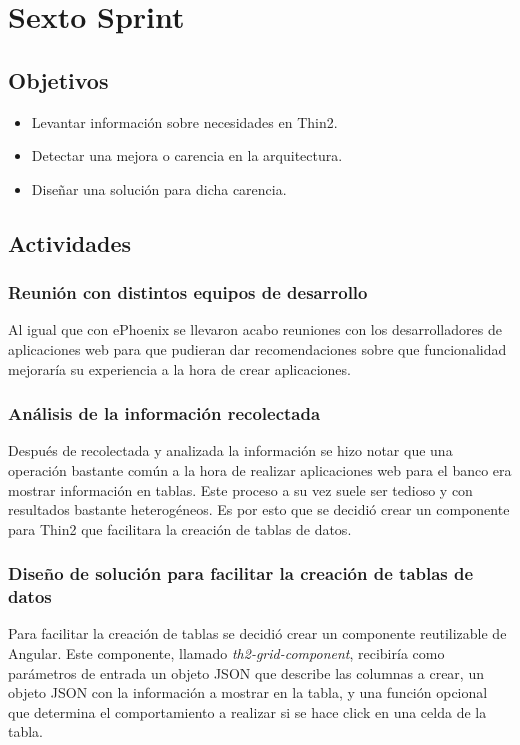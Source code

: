\section{Sexto Sprint}

\subsection{Objetivos}
\begin{itemize}
  \item Levantar información sobre necesidades en Thin2.
  \item Detectar una mejora o carencia en la arquitectura.
  \item Diseñar una solución para dicha carencia.
\end{itemize}
\subsection{Actividades}
\subsubsection{Reunión con distintos equipos de desarrollo}
Al igual que con ePhoenix se llevaron acabo reuniones con los desarrolladores
de aplicaciones web para que pudieran dar recomendaciones sobre que funcionalidad
mejoraría su experiencia a la hora de crear aplicaciones.
\subsubsection{Análisis de la información recolectada}
Después de recolectada y analizada la información se hizo notar que una operación
bastante común a la hora de realizar aplicaciones web para el banco era mostrar
información en tablas. Este proceso a su vez suele ser tedioso y con resultados
bastante heterogéneos. Es por esto que se decidió crear un componente para Thin2
que facilitara la creación de tablas de datos.
\subsubsection{Diseño de solución para facilitar la creación de tablas de datos}
Para facilitar la creación de tablas se decidió crear un componente reutilizable
de Angular. Este componente, llamado \emph{th2-grid-component}, recibiría como
parámetros de entrada un objeto JSON que describe las columnas a crear, un objeto
JSON con la información a mostrar en la tabla, y una función opcional que determina
el comportamiento a realizar si se hace click en una celda de la tabla.

